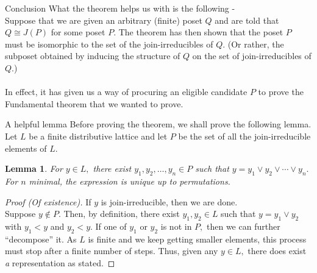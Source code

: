 \documentclass[handout, aspectratio=169]{beamer}
\newtheorem{lem}{Lemma}
\begin{document}
\begin{frame}{Conclusion}
	What the theorem helps us with is the following - \\
	Suppose that we are given an arbitrary (finite) poset $Q$ and are told that $Q \cong J(P)$ for some poset $P.$ The theorem has then shown that the poset $P$ must be isomorphic to the set of the join-irreducibles of $Q.$ (Or rather, the subposet obtained by inducing the structure of $Q$ on the set of join-irreducibles of $Q.$)\\~\\
	In effect, it has given us a way of procuring an eligible candidate $P$ to prove the Fundamental theorem that we wanted to prove.
\end{frame}
\begin{frame}{A helpful lemma}
	Before proving the theorem, we shall prove the following lemma. Let $L$ be a finite distributive lattice and let $P$ be the set of all the join-irreducible elements of $L.$
	\begin{lem}
		For $y \in L,$ there exist $y_1, y_2,\ldots,y_n\in P$ such that $y = y_1 \vee y_2 \vee \cdots \vee y_n.$ For $n$ minimal, the expression is unique up to permutations.
	\end{lem}
	\begin{proof}[Proof (Of existence)]
		If $y$ is join-irreducible, then we are done.\\
		Suppose $y \notin P.$ Then, by definition, there exist $y_1,y_2 \in L$ such that $y = y_1 \vee y_2$ with $y_1 < y$ and $y_2 < y.$ If one of $y_1$ or $y_2$ is not in $P,$ then we can further ``decompose'' it. As $L$ is finite and we keep getting smaller elements, this process must stop after a finite number of steps. Thus, given any $y \in L,$ there does exist \emph{a} representation as stated.
	\end{proof}
\end{frame}
\end{document}
